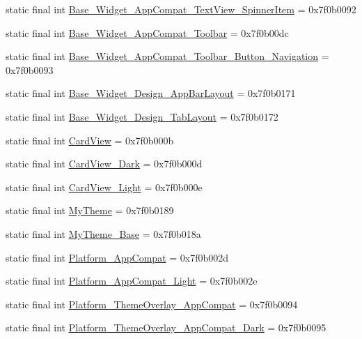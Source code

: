\begin{CompactItemize}
static final int \hyperlink{classandroid_1_1support_1_1v4_1_1_r_1_1style_8d8f6076075c0b21b7d048a79fa34053}{Base\_\-Widget\_\-AppCompat\_\-TextView\_\-SpinnerItem} = 0x7f0b0092
\item 
static final int \hyperlink{classandroid_1_1support_1_1v4_1_1_r_1_1style_ae859d15ff4dec0a8badf4f9d85d7f23}{Base\_\-Widget\_\-AppCompat\_\-Toolbar} = 0x7f0b00dc
\item 
static final int \hyperlink{classandroid_1_1support_1_1v4_1_1_r_1_1style_29a077ca7e38bde6aaf92e5720bf0ae8}{Base\_\-Widget\_\-AppCompat\_\-Toolbar\_\-Button\_\-Navigation} = 0x7f0b0093
\item 
static final int \hyperlink{classandroid_1_1support_1_1v4_1_1_r_1_1style_6ae8c7e641bd0d7d4a01a6e0e75c1871}{Base\_\-Widget\_\-Design\_\-AppBarLayout} = 0x7f0b0171
\item 
static final int \hyperlink{classandroid_1_1support_1_1v4_1_1_r_1_1style_424cb09c2dbf4c514049d88bfcf97c39}{Base\_\-Widget\_\-Design\_\-TabLayout} = 0x7f0b0172
\item 
static final int \hyperlink{classandroid_1_1support_1_1v4_1_1_r_1_1style_589da6dcbb76ceb0d634c59b109674b2}{CardView} = 0x7f0b000b
\item 
static final int \hyperlink{classandroid_1_1support_1_1v4_1_1_r_1_1style_1f3d6a121d4e5415251c3bfde9031b5f}{CardView\_\-Dark} = 0x7f0b000d
\item 
static final int \hyperlink{classandroid_1_1support_1_1v4_1_1_r_1_1style_f8b4c7e6a1ecc4397d6a56cf0ca077d1}{CardView\_\-Light} = 0x7f0b000e
\item 
static final int \hyperlink{classandroid_1_1support_1_1v4_1_1_r_1_1style_f3feb579ef529638f7d9663e523639d9}{MyTheme} = 0x7f0b0189
\item 
static final int \hyperlink{classandroid_1_1support_1_1v4_1_1_r_1_1style_d6a18e2f8986fa0cfba17e9f852a829c}{MyTheme\_\-Base} = 0x7f0b018a
\item 
static final int \hyperlink{classandroid_1_1support_1_1v4_1_1_r_1_1style_9407d9a9827398040d6006a2849ffac5}{Platform\_\-AppCompat} = 0x7f0b002d
\item 
static final int \hyperlink{classandroid_1_1support_1_1v4_1_1_r_1_1style_733e8774a5dca13be40daab70992e9ed}{Platform\_\-AppCompat\_\-Light} = 0x7f0b002e
\item 
static final int \hyperlink{classandroid_1_1support_1_1v4_1_1_r_1_1style_045ae3f2fefb831bae357251526ea54c}{Platform\_\-ThemeOverlay\_\-AppCompat} = 0x7f0b0094
\item 
static final int \hyperlink{classandroid_1_1support_1_1v4_1_1_r_1_1style_e366917dc8a5e07e6e9e05c0e816ade2}{Platform\_\-ThemeOverlay\_\-AppCompat\_\-Dark} = 0x7f0b0095

\end{CompactItemize}
